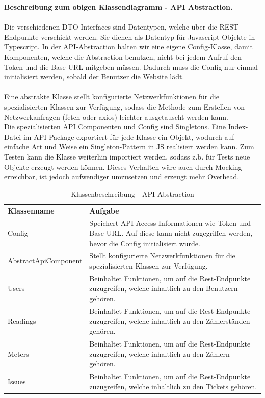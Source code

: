 \textbf{Beschreibung zum obigen Klassendiagramm - API Abstraction.} \\ \\
Die verschiedenen DTO-Interfaces sind Datentypen, welche über die REST-Endpunkte verschickt werden. Sie dienen als Datentyp für Javascript Objekte in Typescript. In der API-Abstraction halten wir eine eigene Config-Klasse, damit Komponenten, welche die Abstraction benutzen, nicht bei jedem Aufruf den Token und die Base-URL mitgeben müssen. Dadurch muss die Config nur einmal initialisiert werden, sobald der Benutzer die Website lädt. \\\\
Eine abstrakte Klasse stellt konfigurierte Netzwerkfunktionen für die spezialisierten Klassen zur Verfügung, sodass die Methode zum Erstellen von Netzwerkanfragen (fetch oder axios) leichter ausgetauscht werden kann. \\
Die spezialisierten API Componenten und Config sind Singletons. Eine Index-Datei im API-Package exportiert für jede Klasse ein Objekt, wodurch auf einfache Art und Weise ein Singleton-Pattern in JS realisiert werden kann.
Zum Testen kann die Klasse weiterhin importiert werden, sodass z.b. für Tests neue Objekte erzeugt werden können. Dieses Verhalten wäre auch durch Mocking erreichbar, ist jedoch aufwendiger umzusetzen und erzeugt mehr Overhead. \\

\begin{table}[H]
	\centering
	\begin{tabularx}{\textwidth}{X X}
		\rowcolor[HTML]{C0C0C0} 
		\textbf{Klassenname} & \textbf{Aufgabe} \\
		Config& Speichert API Access Informationen wie Token und Base-URL. Auf diese kann nicht zugegriffen werden, bevor die Config initialisiert wurde.  \\
		\rowcolor[HTML]{E7E7E7} 
		AbstractApiComponent & Stellt konfigurierte Netzwerkfunktionen für die spezialisierten Klassen zur Verfügung. \\
		Users & Beinhaltet Funktionen, um auf die Rest-Endpunkte zuzugreifen, welche inhaltlich zu den Benutzern gehören. \\
		\rowcolor[HTML]{E7E7E7} 
		Readings & Beinhaltet Funktionen, um auf die Rest-Endpunkte zuzugreifen, welche inhaltlich zu den Zählerständen gehören. \\
		Meters & Beinhaltet Funktionen, um auf die Rest-Endpunkte zuzugreifen, welche inhaltlich zu den Zählern gehören. \\
		\rowcolor[HTML]{E7E7E7} 
		Issues & Beinhaltet Funktionen, um auf die Rest-Endpunkte zuzugreifen, welche inhaltlich zu den Tickets gehören. \\
	\end{tabularx}
	\caption{Klassenbeschreibung - API Abstraction}
	\label{table:klassenbeschreibung-api Abstraction}
\end{table}


